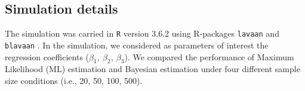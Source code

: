 \documentclass[graybox]{svmult}
\begin{document}
\subsection{Simulation details}


The simulation was carried in \texttt{R} version 3.6.2 \cite{rcoreteamLanguageEnvironmentStatistical2018} using R-packages \texttt{lavaan} \cite{rosseelLavaanPackageStructural2012} and \texttt{blavaan} \cite{merkleBlavaanBayesianStructural2018}. In the simulation, we  considered as parameters of interest the regression coefficients ($\beta_1,\ \beta_2,\ \beta_3$). We compared the performance of Maximum Likelihood (ML) estimation and Bayesian estimation under four different sample size conditions (i.e., 20, 50, 100, 500).

\end{document}
